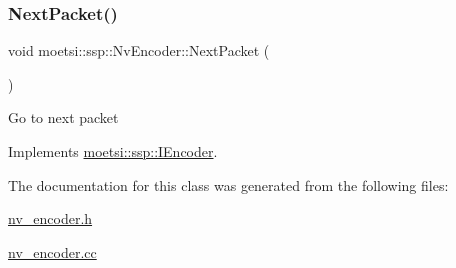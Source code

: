 \mbox{\label{classmoetsi_1_1ssp_1_1NvEncoder_a1c6d801fbb40e7dea2b33dd2ac154919}} 
\subsubsection{\texorpdfstring{Next\+Packet()}{NextPacket()}}
{\footnotesize\ttfamily void moetsi\+::ssp\+::\+Nv\+Encoder\+::\+Next\+Packet (\begin{DoxyParamCaption}{ }\end{DoxyParamCaption})\hspace{0.3cm}{\ttfamily [virtual]}}

Go to next packet 

Implements \hyperlink{classmoetsi_1_1ssp_1_1IEncoder_afac3ddcf2f49be16020c83cb9e0fb274}{moetsi\+::ssp\+::\+I\+Encoder}.



The documentation for this class was generated from the following files\+:\begin{DoxyCompactItemize}
\item 
\hyperlink{nv__encoder_8h}{nv\+\_\+encoder.\+h}\item 
\hyperlink{nv__encoder_8cc}{nv\+\_\+encoder.\+cc}\end{DoxyCompactItemize}
